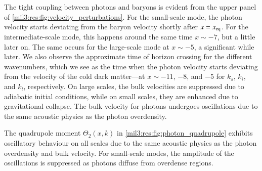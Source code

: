 
The tight coupling between photons and baryons is evident from the upper panel of \cref{mil3:res:fig:velocity_perturbations}. For the small-scale mode, the photon velocity starts deviating from the baryon velocity shortly after $x=x_\mathrm{eq}$. For the intermediate-scale mode, this happens around the same time $x\sim-7$, but a little later on. The same occurs for the large-scale mode at $x\sim -5$, a significant while later. We also observe the approximate time of horizon crossing for the different wavenumbers, which we see as the time when the photon velocity starts deviating from the velocity of the cold dark matter---at $x\sim -11$, $-8$, and $-5$ for $k_s$, $k_i$, and $k_l$, respectively. On large scales, the bulk velocities are suppressed due to adiabatic initial conditions, while on small scales, they are enhanced due to gravitational collapse. The bulk velocity for photons undergoes oscillations due to the same acoustic physics as the photon overdensity.





The quadrupole moment $\Theta_2(x,k)$ in \cref{mil3:res:fig:photon_quadrupole} exhibits oscillatory behaviour on all scales due to the same acoustic physics as the photon overdensity and bulk velocity. For small-scale modes, the amplitude of the oscillations is suppressed as photons diffuse from overdense regions.

